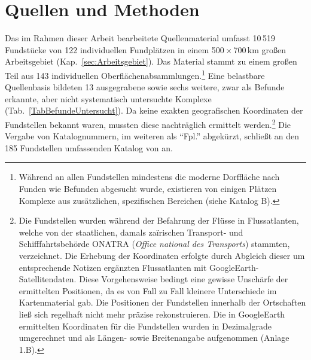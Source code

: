 \chapter{Quellen und Methoden}\label{sec:Quellen}
\begin{multicols}{2}
\raggedcolumns
\noindent Das im Rahmen dieser Arbeit bearbeitete Quellenmaterial umfasst 10\,519 Fundstücke von 122 individuellen Fundplätzen in einem 500\,$\times$\,700\,km großen Arbeitsgebiet (Kap.~\ref{sec:Arbeitsgebiet}). Das Material stammt zu einem großen Teil aus 143 individuellen Oberflächenabsammlungen.\footnote{Während an allen Fundstellen mindestens die moderne Dorffläche nach Funden wie Befunden abgesucht wurde, existieren von einigen Plätzen Komplexe aus zusätzlichen, spezifischen Bereichen (siehe Katalog B).} Eine belastbare Quellenbasis bildeten 13 ausgegrabene sowie sechs weitere, zwar als Befunde erkannte, aber nicht systematisch untersuchte Komplexe (Tab.~\ref{TabBefundeUntersucht}). Da keine exakten geografischen Koordinaten der Fundstellen bekannt waren, mussten diese nachträglich ermittelt werden.\footnote{Die Fundstellen wurden während der Befahrung der Flüsse in Flussatlanten, welche von der staatlichen, damals za{\"i}rischen Transport- und Schifffahrtsbehörde ONATRA (\textit{Office national des Transports}) stammten, verzeichnet. Die Erhebung der Koordinaten erfolgte durch Abgleich dieser um entsprechende Notizen ergänzten Flussatlanten mit GoogleEarth-Satellitendaten. Diese Vorgehensweise bedingt eine gewisse Unschärfe der ermittelten Positionen, da es von Fall zu Fall kleinere Unterschiede im Kartenmaterial gab. Die Positionen der Fundstellen innerhalb der Ortschaften ließ sich regelhaft nicht mehr präzise rekonstruieren. Die in GoogleEarth ermittelten Koordinaten für die Fundstellen wurden in Dezimalgrade umgerechnet und als Längen- sowie Breitenangabe aufgenommen (Anlage 1.B).} Die Vergabe von Katalognummern, im weiteren als \enquote{Fpl.} abgekürzt, schließt an den 185 Fundstellen umfassenden Katalog von \textcite[542\,f. Karte 1]{Wotzka.1995} an.


\end{multicols}
